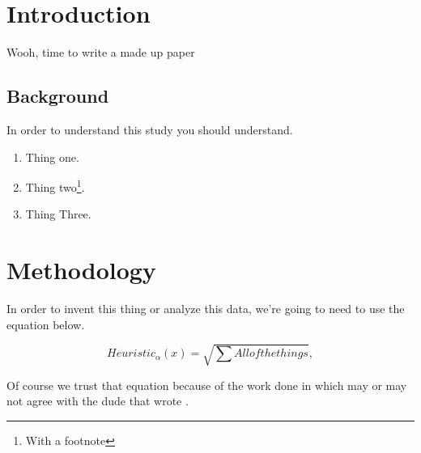 \thispagestyle{firstpage}

\section{Introduction}

Wooh, time to write a made up paper

\subsection{Background}

In order to understand this study you should understand.

\begin{enumerate}
    \item Thing one.
    \item Thing two\footnote{With a footnote}.
    \item Thing Three.
\end{enumerate}


\section{Methodology} 

In order to invent this thing or analyze this data, we're going to need to use the equation below.

\begin{equation}
Heuristic_\alpha(x) = \sqrt{\sum{All of the things}},
\end{equation}

Of course we trust that equation because of the work done in \cite{OnlineRef1} which may or may not agree with the dude that wrote \cite{ArticleRef}.

